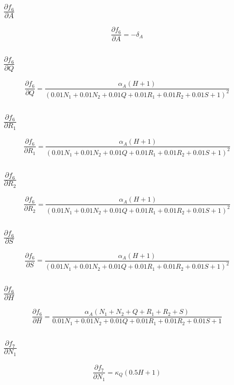 \documentclass{article}
\begin{document}
\subsection{$\frac{\partial f_{6}}{\partial A}$}
\[
\frac{\partial f_{6}}{\partial A} = - \delta_{A}
\]

\subsection{$\frac{\partial f_{6}}{\partial Q}$}
\[
\frac{\partial f_{6}}{\partial Q} = \frac{\alpha_{A} \left(H + 1\right)}{\left(0.01 N_{1} + 0.01 N_{2} + 0.01 Q + 0.01 R_{1} + 0.01 R_{2} + 0.01 S + 1\right)^{2}}
\]

\subsection{$\frac{\partial f_{6}}{\partial R_1}$}
\[
\frac{\partial f_{6}}{\partial R_1} = \frac{\alpha_{A} \left(H + 1\right)}{\left(0.01 N_{1} + 0.01 N_{2} + 0.01 Q + 0.01 R_{1} + 0.01 R_{2} + 0.01 S + 1\right)^{2}}
\]

\subsection{$\frac{\partial f_{6}}{\partial R_2}$}
\[
\frac{\partial f_{6}}{\partial R_2} = \frac{\alpha_{A} \left(H + 1\right)}{\left(0.01 N_{1} + 0.01 N_{2} + 0.01 Q + 0.01 R_{1} + 0.01 R_{2} + 0.01 S + 1\right)^{2}}
\]

\subsection{$\frac{\partial f_{6}}{\partial S}$}
\[
\frac{\partial f_{6}}{\partial S} = \frac{\alpha_{A} \left(H + 1\right)}{\left(0.01 N_{1} + 0.01 N_{2} + 0.01 Q + 0.01 R_{1} + 0.01 R_{2} + 0.01 S + 1\right)^{2}}
\]

\subsection{$\frac{\partial f_{6}}{\partial H}$}
\[
\frac{\partial f_{6}}{\partial H} = \frac{\alpha_{A} \left(N_{1} + N_{2} + Q + R_{1} + R_{2} + S\right)}{0.01 N_{1} + 0.01 N_{2} + 0.01 Q + 0.01 R_{1} + 0.01 R_{2} + 0.01 S + 1}
\]

\subsection{$\frac{\partial f_{7}}{\partial N_1}$}
\[
\frac{\partial f_{7}}{\partial N_1} = \kappa_{Q} \left(0.5 H + 1\right)
\]
\end{document}
